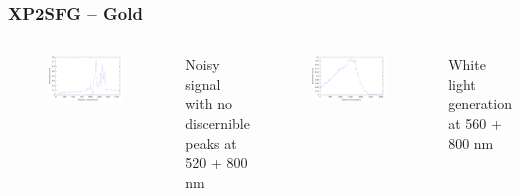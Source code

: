 \documentclass{beamer}
\begin{document}
\begin{frame}
\frametitle{XP2SFG -- Gold}
\begin{columns}
\begin{figure}
\includegraphics[width=\textwidth]{au2+_sfg_520+800}
\end{figure}
\begin{center}
Noisy signal with no discernible\\peaks at 520 + 800 nm
\end{center}
\begin{figure}
\includegraphics[width=\textwidth]{au_sfg_560+800_whitelight}
\end{figure}
\begin{center}
White light generation\\at 560 + 800 nm
\end{center}
\end{columns}
\end{frame}
\end{document}
